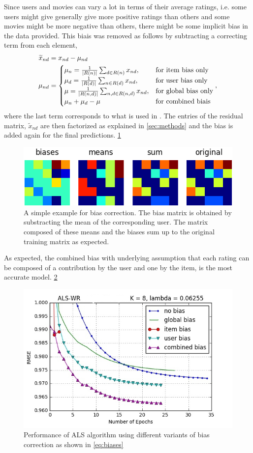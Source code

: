 Since users and movies can vary a lot in terms of their average ratings, i.e. some
users might give generally give more positive ratings than others and some
movies might be more negative than others, there might be some implicit bias in
the data provided. 
This biais was removed as follows by subtracting a correcting term from each
element,
\begin{align}
  \widetilde{x}_{nd} &= x_{nd}-\mu_{nd} \\
  \mu_{nd} &=
 \begin{cases}
  \mu_{n} = \inv{|R(n)|} \sum_{d \in R(n)} x_{nd}, &\text{for item bias only}   \\
\mu_{d} = \inv{|R(d)|} \sum_{n \in R(d)} x_{nd}, &\text{for user bias only} \\
\mu = \inv{|R(n,d)|}\sum_{n,d \in R(n,d)} x_{nd}, &\text{for global bias only}
   \\
  \mu_{n} + \mu_{d} - \mu &\text{for combined biais}
 \end{cases}, 
  \label{eq:biases}
\end{align}
where the last term corresponds to what is used in \cite{Koren2009}. 
The entries of the residual matrix, $\widetilde{x}_{nd}$ are then factorized as explained
in \ref{sec:methods} and the bias is added again for the final predictions.
\ref{fig:matrix}

\begin{figure}[htbp]
  \centering
  \includegraphics[width=.7\columnwidth]{figures/biases_user.png}
  \vspace{-3mm}
  \caption{A simple example for bias correction. The bias matrix is obtained by
  substracting the mean of the corresponding user. The matrix composed of these
  means and the biases sum up to the original training matrix as expected.}
  \label{fig:matrix}
\end{figure}

As expected, the combined bias with underlying assumption that each rating can
be composed of a contribution by the user and one by the item, is the most
accurate model. \ref{fig:bias} 

\begin{figure}[htbp]
  \centering
  \includegraphics[width=.7\columnwidth]{figures/bias.jpg}
  \vspace{-3mm}
  \caption{Performance of ALS algorithm using different variants of bias
  correction as shown in \eqref{eq:biases}}
  \label{fig:bias}
\end{figure}
